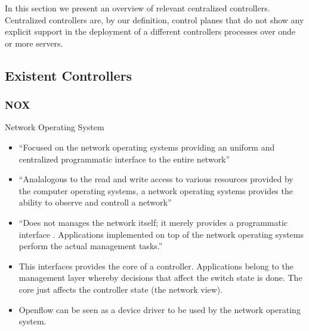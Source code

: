 \documentclass[12pt,openright,twoside]{report}
\begin{document}
\begin{itemize}
In this section we present an overview of relevant centralized
controllers. Centralized controllers are, by our definition, control
planes that do not show any explicit support in the deployment of a
different controllers processes over onde or more servers. 
\subsection{Existent Controllers}
\subsubsection{NOX}
\label{sec:nox}


Network Operating System
\begin{itemize}
\item ``Focused on the network operating systems providing an uniform and centralized programmatic interface to the entire network''
\item ``Analalogous to the read and write access to various resources provided by the computer operating systems, a network operating systems provides the ability to observe and controll a network''
\item ``Does not manages the network itself; it merely provides a programmatic interface . Applications implemented on top of the network operating systems perform the actual management tasks.''
\item This interfaces provides the core of a controller. Applications belong to the management layer whereby decisions that affect the switch state is done. The core just affects the controller state (the network view). 
\item Openflow can be seen as a device driver to be used by the network operating system. 
\end{itemize}


\end{itemize}
\end{document}
